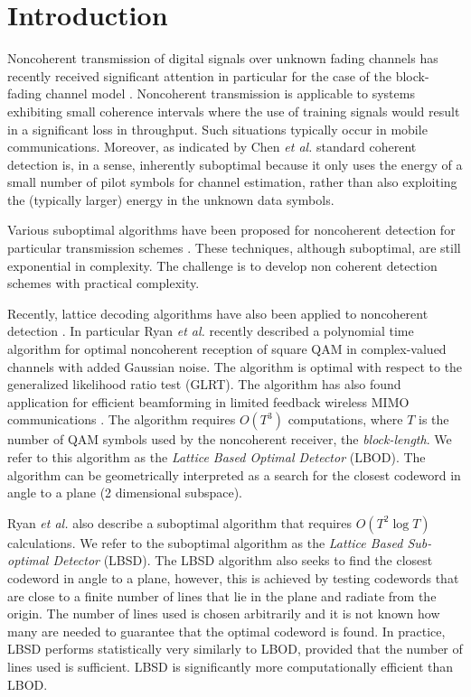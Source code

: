 \documentclass[conference]{IEEEtran}
\begin{document}
\section{Introduction}
Noncoherent transmission of digital signals over unknown fading channels has recently received significant attention in particular for the case of the block-fading channel model \cite{Ryan2007}.  Noncoherent transmission is applicable to systems exhibiting small coherence intervals where the use of training signals would result in a significant loss in throughput.  Such situations typically occur in mobile communications.  Moreover, as indicated by Chen \emph{et al.} \cite{Chen2003} standard coherent detection is, in a sense, inherently suboptimal because it only uses the energy of a small number of pilot symbols for channel estimation, rather than also exploiting the (typically larger) energy in the unknown data symbols.

Various suboptimal algorithms have been proposed for noncoherent detection for particular transmission schemes \cite{Georghiades1997,Warrier2002,Weber1978}.  These techniques, although suboptimal, are still exponential in complexity.  The challenge is to develop non coherent detection schemes with practical complexity.

Recently, lattice decoding algorithms have also been applied to noncoherent detection \cite{Ling2005,Ryan2007}.  In particular Ryan \emph{et al.} \cite{Ryan2007} recently described a polynomial time algorithm for optimal noncoherent reception of square QAM in complex-valued channels with added Gaussian noise.  The algorithm is optimal with respect to the generalized likelihood ratio test (GLRT).  The algorithm has also found application for efficient beamforming in limited feedback wireless MIMO communications \cite{Ryan2007a}.  The algorithm requires $O(T^3)$ computations, where $T$ is the number of QAM symbols used by the noncoherent receiver, the \emph{block-length}.  We refer to this algorithm as the \emph{Lattice Based Optimal Detector} (LBOD).  The algorithm can be geometrically interpreted as a search for the closest codeword in angle to a plane (2 dimensional subspace).

Ryan \emph{et al.} also describe a suboptimal algorithm that requires $O(T^2 \log{T})$ calculations.  We refer to the suboptimal algorithm as the \emph{Lattice Based Sub-optimal Detector} (LBSD).  The LBSD algorithm also seeks to find the closest codeword in angle to a plane, however, this is achieved by testing codewords that are close to a finite number of lines that lie in the plane and radiate from the origin.  The number of lines used is chosen arbitrarily and it is not known how many are needed to guarantee that the optimal codeword is found.  In practice, LBSD performs statistically very similarly to LBOD, provided that the number of lines used is sufficient.  LBSD is significantly more computationally efficient than LBOD.
\end{document}
